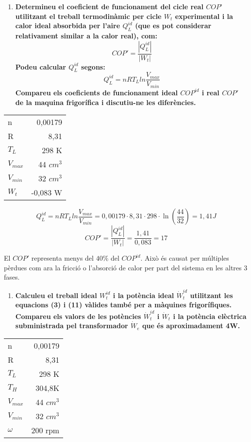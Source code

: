 \documentclass[a4paper]{article}
\begin{document}
\begin{enumerate}[resume]
	\item \textbf{Determineu el coeficient de funcionament del cicle real $COP’$ utilitzant el treball termodinàmic per cicle $W_t$ experimental i la calor ideal absorbida per l’aire $Q_L^{id}$ (que es pot considerar relativament similar a la calor real), com:}
	$$
	COP' = \frac{|Q_L^{id}|}{|W_t|}
	$$
	\textbf{Podeu calcular $Q_L^{id}$ segons:}
	$$
	Q_L^{id} = nRT_L ln \frac{V_{max}}{V_{min}}
	$$
	\textbf{Compareu els coeficients de funcionament ideal $COP^{id}$ i real $COP'$ de la maquina frigorífica i discutiu-ne les diferències.}
\end{enumerate}

\begin{table}[H]
	\centering
	\begin{tabular}{l|r}
		n & 0,00179 \\
		R & 8,31 \\
		$T_L$ & 298 K\\
		$V_{max}$ & 44 $cm^3$ \\
		$V_{min}$ & 32 $cm^3$ \\
		$W_t$ & -0,083 W
	\end{tabular}
\end{table}

$$
Q_L^{id} = nRT_L ln \frac{V_{max}}{V_{min}} =
0,00179·8,31·298·\ln\left(\frac{44}{32}\right) = \boxed{1,41 J}
$$
$$
COP' = \frac{|Q_L^{id}|}{|W_t|} = \frac{1,41}{0,083} = \boxed{17}
$$

El $COP'$ representa menys del $40\%$ del $COP^{id}$. Això és causat per múltiples pèrdues com ara la fricció o l'absorció de calor per part del sistema en les altres 3 fases.

\begin{enumerate}[resume]
	\item \textbf{Calculeu el treball ideal $W_t^{id}$ i la potència ideal $\dot{W}_t^{id}$ utilitzant les equacions (3) i (11) vàlides també per a màquines frigorífiques. Compareu els valors de les potències $\dot{W}_t^{id}$ i $\dot{W}_t$ i la potència elèctrica subministrada pel transformador $\dot{W}_e$ que és aproximadament 4W.}
\end{enumerate}

\begin{table}[H]
	\centering
	\begin{tabular}{l|r}
		n & 0,00179 \\
		R & 8,31\\
		$T_L$ & 298 K\\
		$T_H$ & 304,8K\\
		$V_{max}$ & 44 $cm^3$ \\
		$V_{min}$ & 32 $cm^3$ \\
		$\omega$ & 200 rpm
	\end{tabular}
\end{table}
\end{document}

